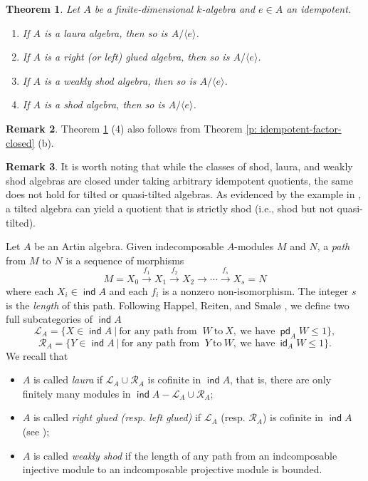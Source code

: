 \documentclass[12pt,a4paper,reqno]{amsart}
\newtheorem{theorem}{Theorem}[section]
\theoremstyle{definition}
\newtheorem{remark}[theorem]{Remark}
\newcommand{\opname}[1]{\operatorname{\mathsf{#1}}}
\newcommand{\ind}{\opname{ind}}
\newcommand{\pd}{\opname{pd}}
\newcommand{\id}{\opname{id}}
\newcommand{\xra}{\xrightarrow}
\begin{document}
\begin{theorem}\label{t: quotient-closed}
Let $A$ be a finite-dimensional $k$-algebra and $e\in A$ an idempotent.
\begin{enumerate}
\item If $A$ is a laura algebra, then so is $A / \langle e \rangle$.
\item If $A$ is a right (or left) glued algebra, then so is $A / \langle e \rangle$.
\item If $A$ is a weakly shod algebra, then so is $A / \langle e \rangle$.
\item If $A$ is a shod algebra, then so is $A / \langle e \rangle$.
\end{enumerate}
\end{theorem}
\begin{remark} 
Theorem \ref{t: quotient-closed} (4) also follows from Theorem \ref{p: idempotent-factor-closed} (b).
\end{remark}
\begin{remark} \label{c: tilted and quasitilted is not closed under quotient} 
It is worth noting that while the classes of shod, laura, and weakly shod algebras are closed under taking arbitrary idempotent quotients, the same does not hold for tilted or quasi-tilted algebras.
As evidenced by the example in \cite[Section 2.5]{BMR08}, a tilted algebra can yield a quotient that is strictly shod (i.e., shod but not quasi-tilted).

\end{remark}
Let $A$ be an Artin algebra.
Given indecomposable $A$-modules $M$ and $N$, a {\em path} from $M$ to $N$ is a sequence of morphisms
\[ M = X_0 \xra{f_1} X_1 \xra{f_2} X_2 \to \cdots \xra{f_s} X_s = N
\]
where each $X_i\in \ind A$ and each $f_i$ is a nonzero non-isomorphism. The integer $s$ is the \emph{length} of this path. Following Happel, Reiten, and Smal{\o} \cite{HRS}, we define two full subcategories of $\ind A$
\[ \mathcal{L}_A = \{ X \in \ind A ~|~ \text{for any path from } ~W~ \text{to} ~X, ~\text{we have}~ \pd_A W \leq 1 \},
\]
\[ \mathcal{R}_A = \{ Y \in \ind A ~|~ \text{for any path from } ~Y~ \text{to} ~W, ~\text{we have}~ \id_A W \leq 1 \}.
\]
We recall that
\begin{itemize}
    \item $A$ is called \emph{laura} if $\mathcal{L}_A \cup \mathcal{R}_A$ is cofinite in $\ind A$, that is, there are only finitely many modules in $\ind A - \mathcal{L}_A \cup \mathcal{R}_A$; 
    \item $A$ is called \emph{right glued (resp. left glued)} if $\mathcal{L}_A$ (resp. $\mathcal{R}_A$) is cofinite in $\ind A$ (see \cite[Lemma 3.1]{AC04}); 
    \item $A$ is called \emph{weakly shod} if the length of any path from an indcomposable injective module to an indcomposable projective module is bounded.
\end{itemize}
\end{document}
